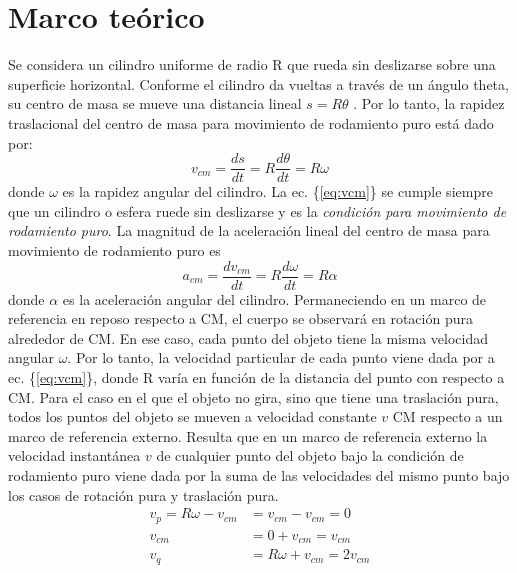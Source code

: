 \section{Marco teórico}
Se considera un cilindro uniforme de radio R que rueda sin deslizarse sobre una superficie horizontal.
Conforme el cilindro da vueltas a través de un ángulo theta, su centro de masa se mueve una distancia
lineal $s=R\theta$ . Por lo tanto, la rapidez traslacional del centro de masa para movimiento de rodamiento
puro está dado por:
\begin{equation}
    v_{cm}=\frac{ds}{dt}=R\frac{d\theta}{dt}=R\omega
    \label{eq:vcm}
\end{equation}
donde $\omega$ es la rapidez angular del cilindro. La ec. \{\ref{eq:vcm}\} se cumple siempre que un cilindro o esfera ruede
sin deslizarse y es la \textit{condición para movimiento de rodamiento puro}. La magnitud de la aceleración
lineal del centro de masa para movimiento de rodamiento puro es
\begin{equation}
    a_{cm}=\frac{dv_{cm}}{dt}=R\frac{d\omega}{dt} = R\alpha
    \label{eq:acm}
\end{equation}
donde $\alpha$ es la aceleración angular del cilindro. Permaneciendo en un marco de referencia en reposo respecto a CM, el cuerpo se observará en rotación pura alrededor de CM. En ese caso, cada punto del objeto
tiene la misma velocidad angular $\omega$. Por lo tanto, la velocidad particular de cada punto viene dada por a
ec. \{\ref{eq:vcm}\}, donde R varía en función de la distancia del punto con respecto a CM. Para el caso en el que el
objeto no gira, sino que tiene una traslación pura, todos los puntos del objeto se mueven a velocidad
constante $v$ CM respecto a un marco de referencia externo. Resulta que en un marco de referencia externo
la velocidad instantánea $v$ de cualquier punto del objeto bajo la condición de rodamiento puro viene dada
por la suma de las velocidades del mismo punto bajo los casos de rotación pura y traslación pura.
\begin{align*}
    v_p=R\omega -v_{cm} &=v_{cm}-v_{cm}=0\\
    v_{cm} &=0+v_{cm}=v_{cm}\\
    v_{q}&= R\omega +v_{cm}=2v_{cm}
\end{align*}